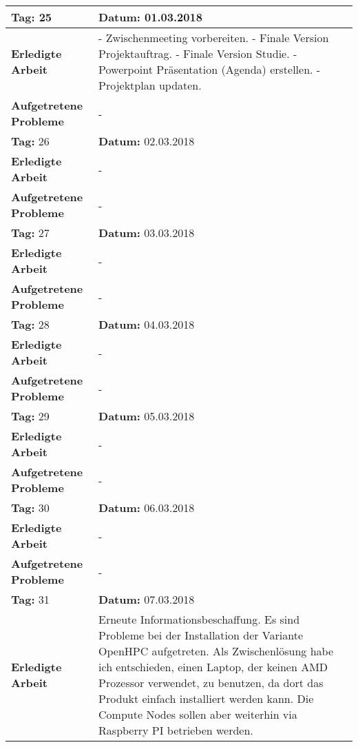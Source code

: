 \begin{longtable}{|p{5cm}|p{5cm}p{6cm}|}
\rowcolor{heading}\textbf{Tag:} 25 & \textbf{Datum:} 01.03.2018 & \\ \hline
\textbf{Erledigte Arbeit} & \multicolumn{2}{p{11cm}|}{- Zwischenmeeting vorbereiten. \newline
- Finale Version Projektauftrag. \newline
- Finale Version Studie. \newline
- Powerpoint Präsentation (Agenda) erstellen. \newline
- Projektplan updaten. } \\ \hline
\textbf{Aufgetretene Probleme} & \multicolumn{2}{p{11cm}|}{-} \\ \hline
\rowcolor{heading}\textbf{Tag:} 26 & \textbf{Datum:} 02.03.2018 & \\ \hline
\textbf{Erledigte Arbeit} & \multicolumn{2}{p{11cm}|}{-} \\ \hline
\textbf{Aufgetretene Probleme} & \multicolumn{2}{p{11cm}|}{-} \\ \hline
\rowcolor{heading}\textbf{Tag:} 27 & \textbf{Datum:} 03.03.2018 & \\ \hline
\textbf{Erledigte Arbeit} & \multicolumn{2}{p{11cm}|}{-} \\ \hline
\textbf{Aufgetretene Probleme} & \multicolumn{2}{p{11cm}|}{-} \\ \hline
\rowcolor{heading}\textbf{Tag:} 28 & \textbf{Datum:} 04.03.2018 & \\ \hline
\textbf{Erledigte Arbeit} & \multicolumn{2}{p{11cm}|}{-} \\ \hline
\textbf{Aufgetretene Probleme} & \multicolumn{2}{p{11cm}|}{-} \\ \hline
\rowcolor{heading}\textbf{Tag:} 29 & \textbf{Datum:} 05.03.2018 & \\ \hline
\textbf{Erledigte Arbeit} & \multicolumn{2}{p{11cm}|}{-} \\ \hline
\textbf{Aufgetretene Probleme} & \multicolumn{2}{p{11cm}|}{-} \\ \hline
\rowcolor{heading}\textbf{Tag:} 30 & \textbf{Datum:} 06.03.2018 & \\ \hline
\textbf{Erledigte Arbeit} & \multicolumn{2}{p{11cm}|}{-} \\ \hline
\textbf{Aufgetretene Probleme} & \multicolumn{2}{p{11cm}|}{-} \\ \hline
\rowcolor{heading}\textbf{Tag:} 31 & \textbf{Datum:} 07.03.2018 & \\ \hline
\textbf{Erledigte Arbeit} & \multicolumn{2}{p{11cm}|}{Erneute Informationsbeschaffung. Es sind Probleme bei der Installation der Variante OpenHPC aufgetreten. Als Zwischenlösung habe ich entschieden, einen Laptop, der keinen AMD Prozessor verwendet, zu benutzen, da dort das Produkt einfach installiert werden kann. Die Compute Nodes sollen aber weiterhin via Raspberry PI betrieben werden.} \\ \hline

\end{longtable}

